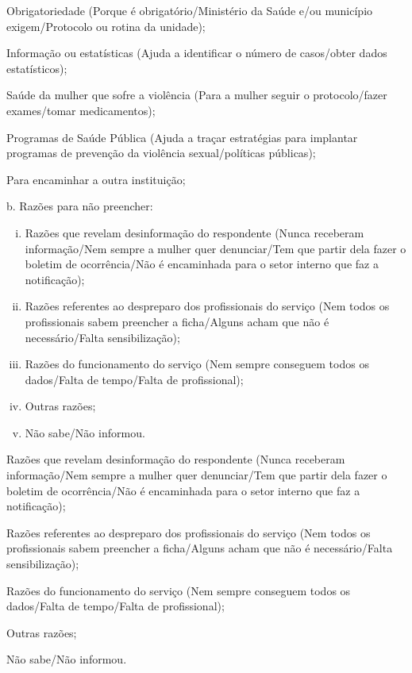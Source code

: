 \documentclass{article}
\begin{document}
Obrigatoriedade (Porque é obrigatório/Ministério da Saúde e/ou município
exigem/Protocolo ou rotina da unidade);

Informação ou estatísticas (Ajuda a identificar o número de casos/obter dados
estatísticos);

Saúde da mulher que sofre a violência (Para a mulher seguir o protocolo/fazer
exames/tomar medicamentos);

Programas de Saúde Pública (Ajuda a traçar estratégias para implantar programas
de prevenção da violência sexual/políticas públicas);

Para encaminhar a outra instituição;

b. Razões para não preencher:

\begin{enumerate}[i.]
\item
Razões que revelam desinformação do respondente (Nunca receberam informação/Nem
sempre a mulher quer denunciar/Tem que partir dela fazer o boletim de
ocorrência/Não é encaminhada para o setor interno que faz a notificação);

\item
Razões referentes ao despreparo dos profissionais do serviço (Nem todos os
profissionais sabem preencher a ficha/Alguns acham que não é necessário/Falta
sensibilização);

\item
Razões do funcionamento do serviço (Nem sempre conseguem todos os dados/Falta de
tempo/Falta de profissional);

\item
Outras razões;

\item
Não sabe/Não informou.

\end{enumerate}

Razões que revelam desinformação do respondente (Nunca receberam informação/Nem
sempre a mulher quer denunciar/Tem que partir dela fazer o boletim de
ocorrência/Não é encaminhada para o setor interno que faz a notificação);

Razões referentes ao despreparo dos profissionais do serviço (Nem todos os
profissionais sabem preencher a ficha/Alguns acham que não é necessário/Falta
sensibilização);

Razões do funcionamento do serviço (Nem sempre conseguem todos os dados/Falta de
tempo/Falta de profissional);

Outras razões;

Não sabe/Não informou.
\end{document}
